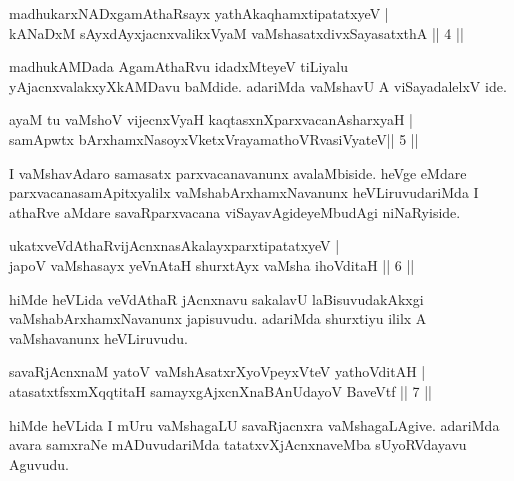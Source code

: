 \begin{shl}
madhukarxNADxgamAthaRsayx yathAkaqhamxtipatatxyeV | \\
kANaDxM sAyxdAyxjacnxvalikxVyaM vaMshasatxdivxSayasatxthA \hfill||  4 ||  
\end{shl}

\begin{artha}
madhukAMDada AgamAthaRvu idadxMteyeV tiLiyalu yAjacnxvalakxyXkAMDavu 
baMdide. adariMda vaMshavU A viSayadalelxV ide.
\end{artha}

\begin{shl}
ayaM tu vaMshoV vijecnxVyaH kaqtasxnXparxvacanAsharxyaH | \\
samApwtx bArxhamxNasoyxVketxVrayamathoVR\s vasiVyateV\hfill ||  5 ||  
\end{shl}

\begin{artha}
I vaMshavAdaro samasatx parxvacanavanunx avalaMbiside. heVge eMdare 
parxvacanasamApitxyalilx vaMshabArxhamxNavanunx heVLiruvudariMda I 
athaRve aMdare savaRparxvacana viSayavAgideyeMbudAgi niNaRyiside.
\end{artha}


\begin{shl}
ukatxveVdAthaRvijAcnxnasAkalayxparxtipatatxyeV | \\
japoV vaMshasayx yeVnAtaH shurxtAyx vaMsha ihoVditaH \hfill||  6 ||  
\end{shl}

\begin{artha}
hiMde heVLida veVdAthaR jAcnxnavu sakalavU laBisuvudakAkxgi 
vaMshabArxhamxNavanunx japisuvudu. adariMda shurxtiyu ililx A 
vaMshavanunx heVLiruvudu.
\end{artha}


\begin{shl}
savaRjAcnxnaM yatoV vaMshAsatxrXyoV\s peyxVteV yathoVditAH | \\
atasatxtfsxmXqqtitaH samayxgAjxcnXnaBAnUdayoV BaveVtf \hfill||  7 ||  
\end{shl}

\begin{artha}
hiMde heVLida I mUru vaMshagaLU savaRjacnxra vaMshagaLAgive. adariMda 
avara samxraNe mADuvudariMda tatatxvXjAcnxnaveMba sUyoRVdayavu Aguvudu.
\end{artha}

